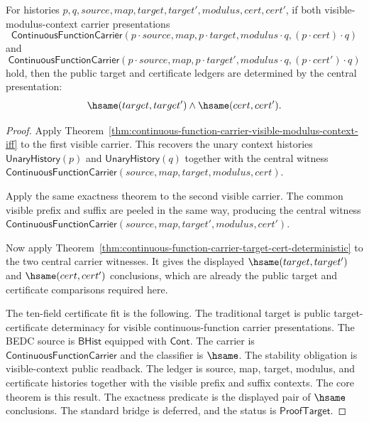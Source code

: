\begin{theorem}
\label{thm:continuous-function-carrier-visible-modulus-context-target-cert-deterministic}
For histories $p,q,source,map,target,target',modulus,cert,cert'$, if both
visible-modulus-context carrier presentations
$$
\mathsf{ContinuousFunctionCarrier}(p\cdot source,map,p\cdot target,
modulus\cdot q,(p\cdot cert)\cdot q)
$$
and
$$
\mathsf{ContinuousFunctionCarrier}(p\cdot source,map,p\cdot target',
modulus\cdot q,(p\cdot cert')\cdot q)
$$
hold, then the public target and certificate ledgers are determined by the
central presentation:
$$
\hsame(target,target')\land\hsame(cert,cert').
$$
\end{theorem}
\begin{proof}
Apply Theorem~\ref{thm:continuous-function-carrier-visible-modulus-context-iff}
to the first visible carrier. This recovers the unary context histories
$\mathsf{UnaryHistory}(p)$ and $\mathsf{UnaryHistory}(q)$ together with the
central witness
$\mathsf{ContinuousFunctionCarrier}(source,map,target,modulus,cert)$.

Apply the same exactness theorem to the second visible carrier. The common
visible prefix and suffix are peeled in the same way, producing the central
witness
$\mathsf{ContinuousFunctionCarrier}(source,map,target',modulus,cert')$.

Now apply
Theorem~\ref{thm:continuous-function-carrier-target-cert-deterministic} to the
two central carrier witnesses. It gives the displayed
$\hsame(target,target')$ and $\hsame(cert,cert')$ conclusions, which are already
the public target and certificate comparisons required here.

The ten-field certificate fit is the following. The traditional target is
public target-certificate determinacy for visible continuous-function carrier
presentations. The BEDC source is $\mathsf{BHist}$ equipped with
$\mathsf{Cont}$. The carrier is $\mathsf{ContinuousFunctionCarrier}$ and the
classifier is $\hsame$. The stability obligation is visible-context public
readback. The ledger is source, map, target, modulus, and certificate histories
together with the visible prefix and suffix contexts. The core theorem is this
result. The exactness predicate is the displayed pair of $\hsame$ conclusions.
The standard bridge is deferred, and the status is $\mathsf{ProofTarget}$.
\end{proof}


